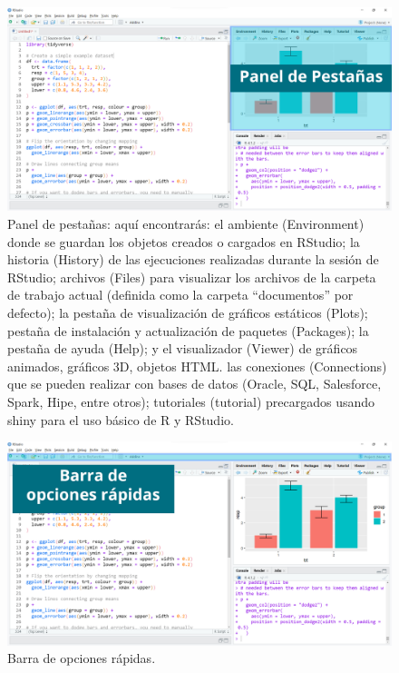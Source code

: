 \documentclass[
]{article}
\theoremstyle{definition}
\theoremstyle{definition}
\theoremstyle{definition}
\theoremstyle{definition}
\theoremstyle{remark}
\begin{document}
\begin{figure}

{\centering \includegraphics[width=1\linewidth]{figs/screenshots/Slide3} 

}

\caption{Panel de pestañas: aquí encontrarás: el ambiente (Environment) donde se guardan los objetos creados o cargados en RStudio; la historia (History) de las ejecuciones realizadas durante la sesión de RStudio; archivos (Files) para visualizar los archivos de la carpeta de trabajo actual (definida como la carpeta ``documentos'' por defecto); la pestaña de visualización de gráficos estáticos (Plots); pestaña de instalación y actualización de paquetes (Packages); la pestaña de ayuda (Help); y el visualizador (Viewer) de gráficos animados, gráficos 3D, objetos HTML. las conexiones (Connections) que se pueden realizar con bases de datos (Oracle, SQL, Salesforce, Spark, Hipe, entre otros); tutoriales (tutorial) precargados usando shiny para el uso básico de R y RStudio.}\label{fig:figura16}
\end{figure}



\begin{figure}

{\centering \includegraphics[width=1\linewidth]{figs/screenshots/Slide6} 

}

\caption{Barra de opciones rápidas.}\label{fig:figura17}
\end{figure}
\end{document}
